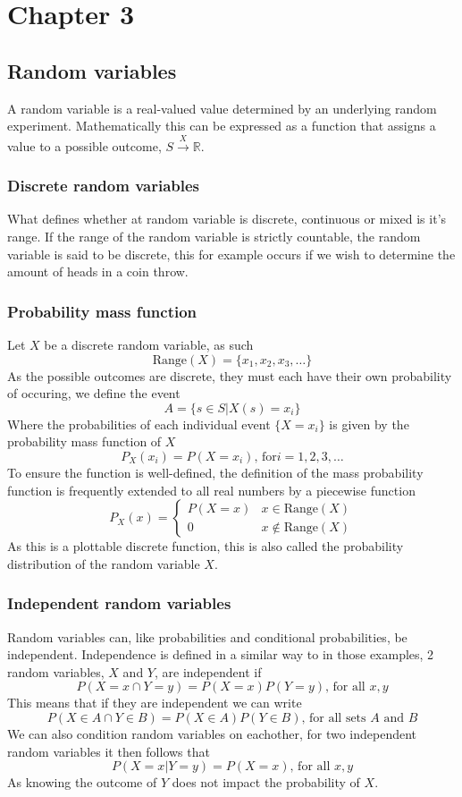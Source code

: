 \section{Chapter 3}
\subsection{Random variables}
\begin{definition}
    A random variable is a real-valued value determined by an underlying random experiment. Mathematically this can be expressed as a function that assigns a value to a possible outcome, $S\xrightarrow{X} \mathbb{R}$.
\end{definition}
\subsubsection{Discrete random variables}
What defines whether at random variable is discrete, continuous or mixed is it's range. If the range of the random variable is strictly countable, the random variable is said to be discrete, this for example occurs if we wish to determine the amount of heads in a coin throw.

\subsubsection{Probability mass function}
Let $X$ be a discrete random variable, as such
\[
    \text{Range}(X)=\{x_{1},x_{2},x_{3},\ldots\}
\]
As the possible outcomes are discrete, they must each have their own probability of occuring, we define the event
\[
    A=\{s\in S|X(s)=x_{i}\}
\]
Where the probabilities of each individual event $\{X=x_{i}\}$ is given by the probability mass function of $X$
\[
    P_{X}(x_{i})=P(X=x_{i})\text{, for} i=1,2,3,\ldots
\]
To ensure the function is well-defined, the definition of the mass probability function is frequently extended to all real numbers by a piecewise function
\[
    P_{X}(x)=\begin{cases}P(X=x) & x\in \text{Range}(X) \\ 0 & x\notin \text{Range}(X)\end{cases}
\]
As this is a plottable discrete function, this is also called the probability distribution of the random variable $X$.

\subsubsection{Independent random variables}
Random variables can, like probabilities and conditional probabilities, be independent. Independence is defined in a similar way to in those examples, 2 random variables, $X$ and $Y$, are independent if
\[
    P(X=x\cap Y=y)=P(X=x)P(Y=y) \text{, for all } x,y
\]
This means that if they are independent we can write
\[
    P(X\in A\cap Y\in B)=P(X\in A)P(Y\in B)\text{, for all sets } A \text{ and } B
\]
We can also condition random variables on eachother, for two independent random variables it then follows that
\[
    P(X=x|Y=y)=P(X=x)\text{, for all } x,y
\]
As knowing the outcome of $Y$ does not impact the probability of $X$.

